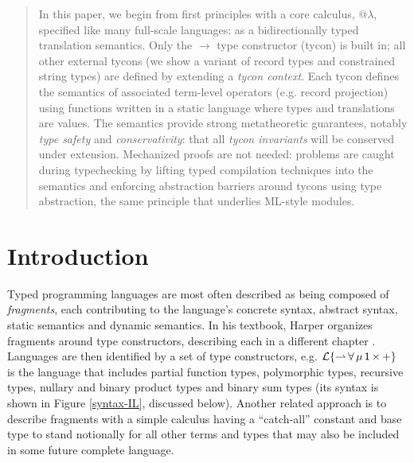 \documentclass[10pt,preprint]{sigplanconf}
\begin{document}
\begin{abstract}
In this paper, we begin from first principles with a core calculus, @$\lambda$, specified like many full-scale languages: as a bidirectionally typed translation semantics. Only the $\rightarrow$ type constructor (tycon) is built in; all other external tycons (we show a variant of record types and constrained string types) are defined by extending a \emph{tycon context}. Each tycon defines the semantics of associated term-level operators (e.g. record projection) using functions written in a static language where types and translations are values. The semantics provide  strong metatheoretic guarantees, notably \emph{type safety} and \emph{conservativity}: that all \emph{tycon  invariants} will be conserved under extension. Mechanized proofs are not needed: problems are caught during typechecking by lifting typed compilation techniques into the semantics and enforcing abstraction barriers around tycons using type abstraction, the same principle that underlies ML-style modules.
\end{abstract}

\section{Introduction}\label{intro}
Typed programming languages are most often described as being composed of \emph{fragments}, each contributing to the language's concrete syntax, abstract syntax, static semantics and dynamic semantics. 
In his textbook, Harper organizes fragments around type constructors, describing each in a different chapter \cite{pfpl}. Languages are then identified by a set of type constructors, e.g. $\mathcal{L}\{{\rightharpoonup}\,{\forall}\,{\mu}\,{{\sf 1}}\,{\times}\,{+}\}$ is the language that includes partial function types, polymorphic types, recursive types, nullary and binary product types and binary sum types (its syntax is shown in Figure \ref{syntax-IL}, discussed below).
Another related approach is to describe fragments with a simple calculus having a ``catch-all'' constant and base type to stand notionally for all other terms and types that may also be included in some future complete language.
\end{document}
